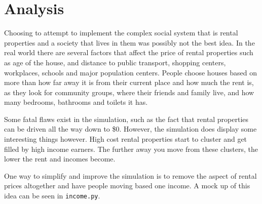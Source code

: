 \section{Analysis}

\par
Choosing to attempt to implement the complex social system that is rental properties and a society that lives in them was possibly not the best idea. In the real world there are several factors that affect the price of rental properties such as age of the house, and distance to public transport, shopping centers, workplaces, schools and major population centers. People choose houses based on more than how far away it is from their current place and how much the rent is, as they look for community groups, where their friends and family live, and how many bedrooms, bathrooms and toilets it has.

\par
Some fatal flaws exist in the simulation, such as the fact that rental properties can be driven all the way down to \$0. However, the simulation does display some interesting things however. High cost rental properties start to cluster and get filled by high income earners. The further away you move from these clusters, the lower the rent and incomes become.

\par
One way to simplify and improve the simulation is to remove the aspect of rental prices altogether and have people moving based one income. A mock up of this idea can be seen in \texttt{income.py}.